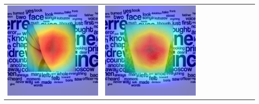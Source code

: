 \begin{landscape}
\begin{table}[]
\begin{tabular}{@{}c c c c c c c c c c@{}}
			\includegraphics[width=.12\textheight ,keepaspectratio]{images/pretraining/gradcam/3/DenseNet169CombinedGradCam.png} &
			\includegraphics[width=.12\textheight ,keepaspectratio]{images/pretraining/gradcam/9/DenseNet169CombinedGradCam.png} &

\end{tabular}
\end{table}
\end{landscape}
